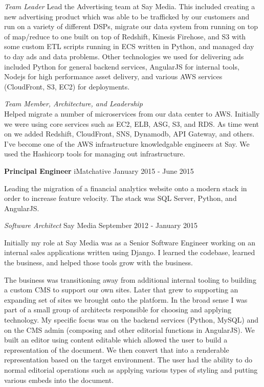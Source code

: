 \documentclass[margin]{res}
\begin{document}
\begin{resume}
                \emph{Team Leader} Lead the Advertising team at Say Media.  This included creating a new
                advertising product which was able to be trafficked by our customers and run
                on a variety of different DSPs, migrate our data system from running on
                top of map/reduce to one built on top of Redshift, Kinesis Firehose, and
                S3 with some custom ETL scripts running in ECS written in Python, and managed
                day to day ads and data problems.  Other technologies we used for delivering
                ads included Python for general backend services, AngularJS for internal
                tools, Nodejs for high performance asset delivery,
                and various AWS services (CloudFront, S3, EC2) for deployments.

                \emph{Team Member, Architecture, and Leadership}\\
                Helped migrate a number of microservices from our data center to
                AWS.  Initially we were using core services such as EC2, ELB, ASG, S3,
                and RDS.  As time went on we added Redshift, CloudFront, SNS, Dynamodb,
                API Gateway, and others.  I've become one of the AWS infrastructure
                knowledgable engineers at Say.  We used the Hashicorp tools for managing
                out infrastructure.

                \textbf{Principal Engineer} iMatchative \hfill January 2015 - June 2015

                Leading the migration of a financial analytics website onto a modern stack
                in order to increase feature velocity.  The stack was SQL Server,
                Python, and AngularJS.
 
                {\sl\large Software Architect} Say Media \hfill September 2012 - January 2015

                Initially my role at Say Media was as a Senior Software Engineer working
                on an internal sales applications written using Django. I learned the
                codebase, learned the business, and helped those tools grow with the
                business.

                The business was transitioning away from additional internal tooling
                to building a custom CMS to support our own sites. Later that grew to
                supporting an expanding set of sites we brought onto the platform. In
                the broad sense I was part of a small group of architects responsible
                for choosing and applying technology. My specific focus was on the
                backend services (Python, MySQL) and on the CMS admin (composing and
                other editorial functions in AngularJS). We built an editor using
                content editable which allowed the user to build a representation of
                the document. We then convert that into a renderable representation
                based on the target environment. The user had the ability to do normal
                editorial operations such as applying various types of styling and
                putting various embeds into the document.


\end{resume}
\end{document}
